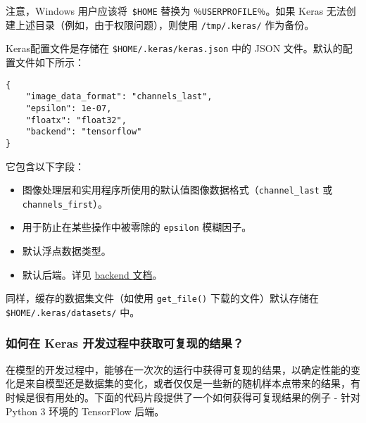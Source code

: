 \begin{Shaded}
\begin{Highlighting}[]
\end{Highlighting}
\end{Shaded}

注意，Windows 用户应该将~\texttt{\$HOME} 替换为
\texttt{％USERPROFILE％}。如果 Keras
无法创建上述目录（例如，由于权限问题），则使用 \texttt{/tmp/.keras/}
作为备份。

Keras配置文件是存储在 \texttt{\$HOME/.keras/keras.json} 中的 JSON
文件。默认的配置文件如下所示：

\begin{verbatim}
{
    "image_data_format": "channels_last",
    "epsilon": 1e-07,
    "floatx": "float32",
    "backend": "tensorflow"
}
\end{verbatim}

它包含以下字段：

\begin{itemize}
\tightlist
\item
  图像处理层和实用程序所使用的默认值图像数据格式（\texttt{channel\_last}
  或 \texttt{channels\_first}）。
\item
  用于防止在某些操作中被零除的 \texttt{epsilon} 模糊因子。
\item
  默认浮点数据类型。
\item
  默认后端。详见 \hyperref[keras-backend]{backend 文档}。
\end{itemize}

同样，缓存的数据集文件（如使用 \texttt{get\_file()}
下载的文件）默认存储在 \texttt{\$HOME/.keras/datasets/} 中。



\subsubsection{如何在 Keras
开发过程中获取可复现的结果？}\label{how-can-i-obtain-reproducible-results-using-keras-during-development}

在模型的开发过程中，能够在一次次的运行中获得可复现的结果，以确定性能的变化是来自模型还是数据集的变化，或者仅仅是一些新的随机样本点带来的结果，有时候是很有用处的。下面的代码片段提供了一个如何获得可复现结果的例子
- 针对 Python 3 环境的 TensorFlow 后端。

